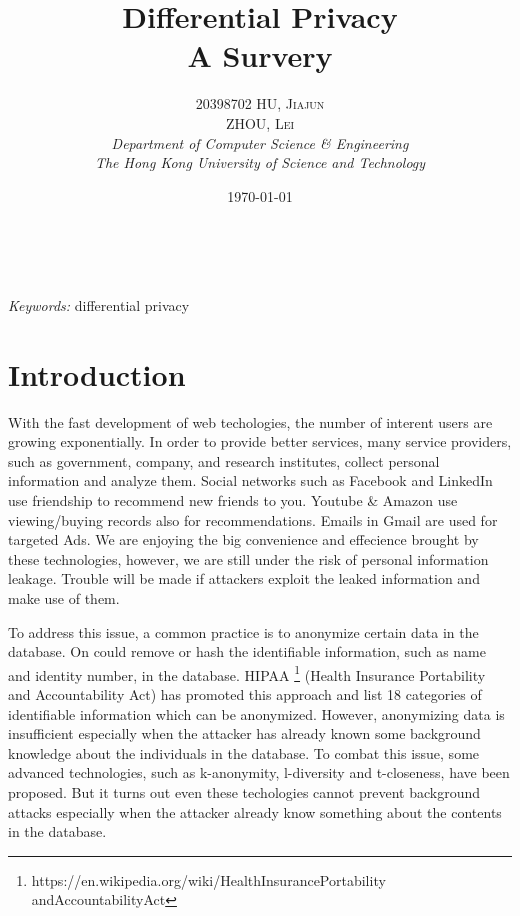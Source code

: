\documentclass[a4paper, 11pt]{article} %
\title{\textbf{Differential Privacy}\\ %
A Survery} %
\author{\textsc{20398702 HU, Jiajun \\ ZHOU, Lei} %
\\{\textit{Department of Computer Science \& Engineering \\ The Hong Kong University of Science and Technology}}} %
\date{\today} %
\makeatletter
\theoremstyle{definition}
\renewcommand{\maketitle}{ %
\begin{flushright} %
{\LARGE\@title} %

\vspace{50pt} %

{\large\@author} %
\\\@date %

\vspace{40pt} %
\end{flushright}
}
\makeatother
\begin{document}
\maketitle %



\begin{abstract}

\end{abstract}

\hspace*{3,6mm}\textit{Keywords:} differential privacy %

\vspace{30pt} %


\section{Introduction}
With the fast development of web techologies, the number of interent users are growing exponentially. In order to provide better services, many service providers, such as government, company, and research institutes, collect personal information and analyze them. Social networks such as Facebook and LinkedIn use friendship to recommend new friends to you. Youtube \& Amazon use viewing/buying records also for recommendations. Emails in Gmail are used for targeted Ads. We are enjoying the big convenience and effecience brought by these technologies, however, we are still under the risk of personal information leakage. Trouble will be made if attackers exploit the leaked information and make use of them.

To address this issue, a common practice is to anonymize certain data in the database. On could remove or hash the identifiable information, such as name and identity number, in the database. HIPAA \footnote{https://en.wikipedia.org/wiki/Health\textunderscore Insurance\textunderscore Portability \textunderscore and\textunderscore Accountability\textunderscore Act}  (Health Insurance Portability and Accountability Act) has promoted this approach and list 18 categories of identifiable information which can be anonymized. However, anonymizing data is insufficient especially when the attacker has already known some background knowledge about the individuals in the database. To combat this issue, some advanced technologies, such as k-anonymity\cite{sweeney2002k}, l-diversity\cite{machanavajjhala2007diversity} and t-closeness\cite{li2007t}, have been proposed. But it turns out even these techologies cannot prevent background attacks especially when the attacker already know something about the contents in the database\cite{ji2014differential}. 
\end{document}
